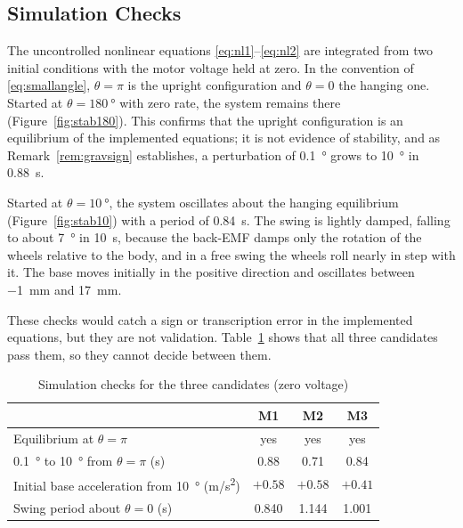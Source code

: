 \subsection{Simulation Checks}
\label{sec:simchecks}

The uncontrolled nonlinear equations \eqref{eq:nl1}--\eqref{eq:nl2} are
integrated from two initial conditions with the motor voltage held at zero.
In the convention of \eqref{eq:smallangle}, $\theta=\pi$ is the upright
configuration and $\theta=0$ the hanging one. Started at
$\theta=\SI{180}{\degree}$ with zero rate, the system remains there
(Figure~\ref{fig:stab180}). This confirms that the upright configuration is an
equilibrium of the implemented equations; it is not evidence of stability, and
as Remark~\ref{rem:gravsign} establishes, a perturbation of \SI{0.1}{\degree}
grows to \SI{10}{\degree} in \SI{0.88}{s}.

Started at $\theta=\SI{10}{\degree}$, the system oscillates about the hanging
equilibrium (Figure~\ref{fig:stab10}) with a period of \SI{0.84}{s}. The swing
is lightly damped, falling to about \SI{7}{\degree} in \SI{10}{s}, because the
back-EMF damps only the rotation of the wheels relative to the body, and in a
free swing the wheels roll nearly in step with it. The base moves initially in
the positive direction and oscillates between \SI{-1}{mm} and \SI{17}{mm}.

These checks would catch a sign or transcription error in the implemented
equations, but they are not validation. Table~\ref{tab:simchecks} shows that
all three candidates pass them, so they cannot decide between them.

\begin{table}[htbp]
\centering
\caption{Simulation checks for the three candidates (zero voltage)}
\label{tab:simchecks}
\begin{tabular}{lccc}
\toprule
 & M1 & M2 & M3 \\
\midrule
Equilibrium at $\theta=\pi$ & yes & yes & yes \\
\SI{0.1}{\degree} to \SI{10}{\degree} from $\theta=\pi$ (\si{s}) & 0.88 & 0.71 & 0.84 \\
Initial base acceleration from \SI{10}{\degree} (\si{m/s^2}) & $+0.58$ & $+0.58$ & $+0.41$ \\
Swing period about $\theta=0$ (\si{s}) & 0.840 & 1.144 & 1.001 \\
\bottomrule
\end{tabular}
\end{table}


